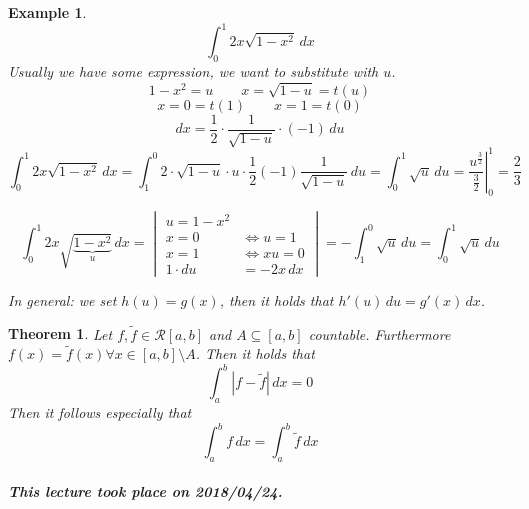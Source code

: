 \documentclass{article}
\newtheorem{theorem}{Theorem}  \numberwithin{theorem}{section}
\newtheorem{example}{Example}  \numberwithin{example}{section}
\newcommand{\card}[1]{\left|#1\right|}
\newcommand{\dateref}[1]{\paragraph{\textit{This lecture took place on #1.}}}
\begin{document}
\begin{example}
  \[ \int_0^1 2x \sqrt{1 - x^2} \, dx \]
  Usually we have some expression, we want to substitute with $u$.
  \[ 1 - x^2 = u \qquad x = \sqrt{1 - u} = t(u) \]
  \[ x = 0 = t(1) \qquad x = 1 = t(0) \]
  \[ dx = \frac12 \cdot \frac{1}{\sqrt{1 - u}} \cdot (-1) \, du \]
  \[ \int_0^1 2x \sqrt{1 - x^2} \, dx = \int_1^0 2 \cdot \sqrt{1 - u} \cdot u \cdot \frac12 (-1) \frac{1}{\sqrt{1 - u}} \, du = \int_0^1 \sqrt{u} \, du = \left. \frac{u^{\frac32}}{\frac32} \right|_0^1 = \frac23 \]

  \[
    \int_0^1 2x \sqrt{\underbrace{1 - x^2}_{u}} \, dx =
    \begin{vmatrix}
      u = 1 - x^2 & \\
      x = 0 & \Leftrightarrow u = 1 \\
      x = 1 & \Leftrightarrow xu = 0 \\
      1 \cdot du &= -2x \, dx
    \end{vmatrix}
    = -\int_1^0 \sqrt{u} \, du = \int_0^1 \sqrt{u} \, du
  \]

  In general: we set $h(u) = g(x)$, then it holds that $h'(u) \, du = g'(x) \, dx$.
\end{example}

\begin{theorem} %
  \label{satz7countable}
  Let $f, \tilde f \in \mathcal R[a,b]$ and $A \subseteq [a,b]$ countable.
  Furthermore $f(x) = \tilde f(x) \forall x \in [a,b] \setminus A$.
  Then it holds that
  \[ \int_a^b \card{f - \tilde f} \, dx = 0 \]
  Then it follows especially that
  \[ \int_a^b f \, dx = \int_a^b \tilde f \, dx \]
\end{theorem}

\dateref{2018/04/24}
\end{document}
